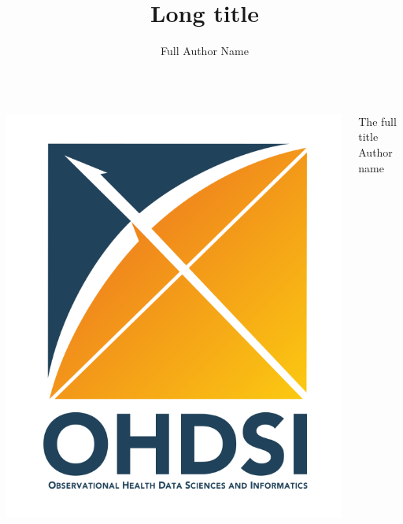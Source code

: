 \documentclass[11pt
,fragile=singleslide
]{beamer}
\title[
short title
]
{
	Long title
}
\subtitle
{} %
\author[Short Name]{Full Author Name}
\institute[UCLA] %
{
	Departments of Biomathematics and Human Genetics \\
	David Geffen School of Medicine at UCLA, and \\
	Department of Biostatistics \\
	UCLA Fielding School of Public Health
}
\begin{document}
\begin{frame}
\begin{columns}
	\begin{column}{0.33\textwidth}
		\includegraphics[width=1.0\textwidth]{figures/logo_title_page}
	\end{column}
	\begin{column}{0.66\textwidth}
		\begin{center}
			{\LARGE
				The full title } \\[2em]
			
				Author name
		\end{center}
	\end{column}
\end{columns}
\vspace{1em}
\vspace{1em}

\end{frame}

%
\end{document}
